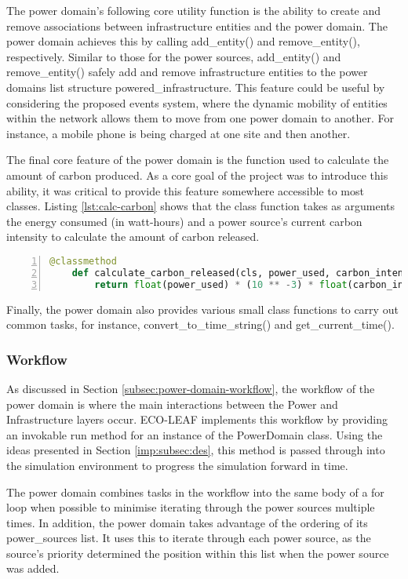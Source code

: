 \documentclass{l4proj}
\begin{document}
The power domain's following core utility function is the ability to create and remove associations between infrastructure entities and the power domain.
The power domain achieves this by calling add\_entity() and remove\_entity(), respectively.
Similar to those for the power sources, add\_entity() and remove\_entity() safely add and remove infrastructure entities to the power domains list structure powered\_infrastructure.
This feature could be useful by considering the proposed events system, where the dynamic mobility of entities within the network allows them to move from one power domain to another. For instance, a mobile phone is being charged at one site and then another.

The final core feature of the power domain is the function used to calculate the amount of carbon produced.
As a core goal of the project was to introduce this ability, it was critical to provide this feature somewhere accessible to most classes.
Listing \ref{lst:calc-carbon} shows that the class function takes as arguments the energy consumed (in watt-hours) and a power source's current carbon intensity to calculate the amount of carbon released.
\begin{lstlisting}[language=python, numbers=left, caption={Listing showing the class method used to calculate carbon emissions.}, label=lst:calc-carbon]
    @classmethod
    def calculate_carbon_released(cls, power_used, carbon_intensity) -> float:
        return float(power_used) * (10 ** -3) * float(carbon_intensity)
\end{lstlisting}

Finally, the power domain also provides various small class functions to carry out common tasks, for instance, convert\_to\_time\_string() and get\_current\_time().

\subsubsection{Workflow}\label{imp:subsec:workflow}
As discussed in Section \ref{subsec:power-domain-workflow}, the workflow of the power domain is where the main interactions between the Power and Infrastructure layers occur.
ECO-LEAF implements this workflow by providing an invokable run method for an instance of the PowerDomain class.
Using the ideas presented in Section \ref{imp:subsec:des}, this method is passed through into the simulation environment to progress the simulation forward in time.

The power domain combines tasks in the workflow into the same body of a for loop when possible to minimise iterating through the power sources multiple times.
In addition, the power domain takes advantage of the ordering of its power\_sources list. It uses this to iterate through each power source, as the source's priority determined the position within this list when the power source was added.
\end{document}

